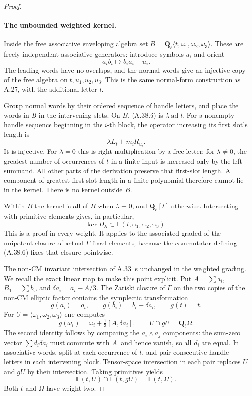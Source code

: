 \begin{proof}
\paragraph{The unbounded weighted kernel.}
Inside the free associative enveloping algebra set
\(B=\mathbf Q_\ell\langle t,\omega_1,\omega_2,
\omega_3\rangle\). These are freely independent
associative generators: introduce symbols \(u_i\)
and orient
\[
                  a_i b_i\longmapsto b_i a_i+u_i.
\]
The leading words have no overlaps, and the normal
words give an injective copy of the free algebra
on \(t,u_1,u_2,u_3\). This is the same normal-form
construction as A.27, with the additional letter
\(t\).

Group normal words by their ordered sequence of
handle letters, and place the words in \(B\)
in the intervening slots. On \(B\), (A.38.6)
is \(\lambda\operatorname{ad}t\). For a nonempty
handle sequence beginning in the \(i\)-th block,
the operator increasing its first slot's length is
\[
                       \lambda L_t+m_iR_{u_i}.       \tag{A.38.7}
\]
It is injective. For \(\lambda=0\) this is right
multiplication by a free letter; for
\(\lambda\ne0\), the greatest number of occurrences
of \(t\) in a finite input is increased only by the
left summand. All other parts of the derivation
preserve that first-slot length. A component of
greatest first-slot length in a finite polynomial
therefore cannot lie in the kernel. There is no
kernel outside \(B\).

Within \(B\) the kernel is all of \(B\) when
\(\lambda=0\), and \(\mathbf Q_\ell[t]\) otherwise.
Intersecting with primitive elements gives, in
particular,
\[
 \ker D_\lambda\subset
               \mathbb L(t,\omega_1,\omega_2,\omega_3).
                                                            \tag{A.38.8}
\]
This is a proof in every weight. It applies to
the associated graded of the unipotent closure
of actual \(\Gamma\)-fixed elements, because
the commutator defining (A.38.6) fixes that closure
pointwise.

The non-CM invariant intersection of A.33 is unchanged
in the weighted grading. We recall the exact linear
map to make this point explicit. Put
\(A=\sum a_i\), \(B_1=\sum b_i\), and
\(\delta a_i=a_i-A/3\). The Zariski closure of
\(\Gamma\) on the two copies of the non-CM elliptic
factor contains the symplectic transformation
\[
 g(a_i)=a_i,\qquad g(b_i)=b_i+\delta a_i,\qquad g(t)=t.
\]
For \(U=\langle\omega_1,\omega_2,\omega_3\rangle\)
one computes
\[
 g(\omega_i)=\omega_i+\tfrac13[A,\delta a_i],
 \qquad U\cap gU=\mathbf Q_\ell\Omega.               \tag{A.38.9}
\]
The second identity follows by comparing the
\(a_i\wedge a_j\) components: the sum-zero vector
\(\sum d_i\delta a_i\) must commute with \(A\),
and hence vanish, so all \(d_i\) are equal.
In associative words, split at each occurrence
of \(t\), and pair consecutive handle letters
in each intervening block. Tensor-space intersection
in each pair replaces \(U\) and \(gU\) by their
intersection. Taking primitives yields
\[
 \mathbb L(t,U)\cap\mathbb L(t,gU)
                       =\mathbb L(t,\Omega).         \tag{A.38.10}
\]
Both \(t\) and \(\Omega\) have weight two.


\end{proof}
